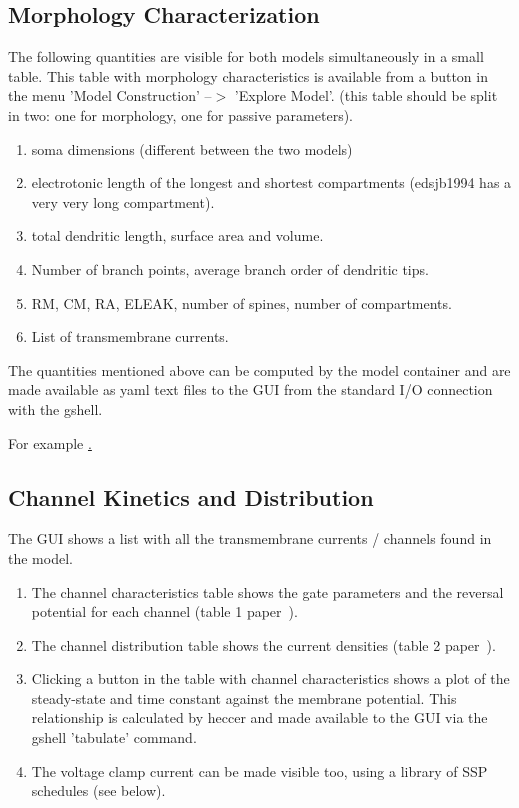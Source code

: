 \documentclass[12pt]{article}
\begin{document}
\subsection{Morphology Characterization}
The following quantities are visible for both models simultaneously
in a small table.  This table with morphology characteristics is
available from a button in the menu 'Model Construction' --$>$
'Explore Model'.  (this table should be split in two: one for
morphology, one for passive parameters).
\begin{enumerate}
\item soma dimensions (different between the two models)
\item electrotonic length of the longest and shortest compartments
  (edsjb1994 has a very very long compartment).
\item total dendritic length, surface area and volume.
\item Number of branch points, average branch order of dendritic tips.
\item RM, CM, RA, ELEAK, number of spines, number of compartments.
\item List of transmembrane currents.
\end{enumerate}
The quantities mentioned above can be computed by the model container
and are made available as yaml text files to the GUI from the standard
I/O connection with the gshell.

For example
\href{../pub-purkinje-deschutter-morphology/pub-purkinje-deschutter-morphology.tex}.

\subsection{Channel Kinetics and Distribution}

The GUI shows a list with all the transmembrane currents /
channels found in the model.
\begin{enumerate}
\item The channel characteristics table shows the gate parameters and
  the reversal potential for each channel (table 1
  paper~\cite{deschutter94:_purkin_i}).
\item The channel distribution table shows the current densities
  (table 2 paper~\cite{deschutter94:_purkin_i}).
\item Clicking a button in the table with channel characteristics
  shows a plot of the steady-state and time constant against the
  membrane potential.  This relationship is calculated by heccer and
  made available to the GUI via the gshell 'tabulate' command.
\item The voltage clamp current can be made visible too, using a
  library of SSP schedules (see below).
\end{enumerate}
\end{document}
